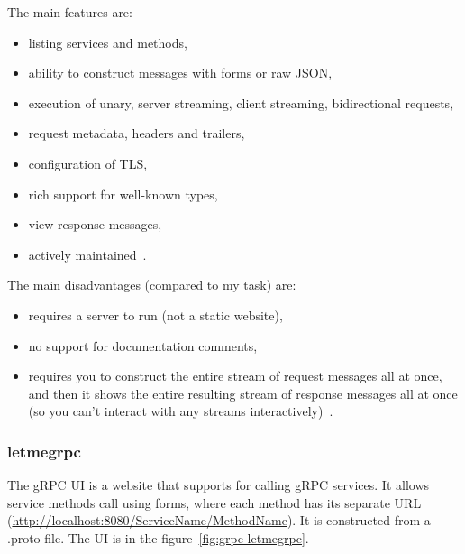 The main features are:
\begin{itemize}
    \item listing services and methods,
    \item ability to construct messages with forms or raw JSON,
    \item execution of unary, server streaming, client streaming, bidirectional requests,
    \item request metadata, headers and trailers,
    \item configuration of TLS,
    \item rich support for well-known types,
    \item view response messages,
    \item actively maintained~\cite{grpc-grpcui}.
\end{itemize}

The main disadvantages (compared to my task) are:
\begin{itemize}
    \item requires a server to run (not a static website),
    \item no support for documentation comments,
    \item requires you to construct the entire stream of request messages all at once, and then it shows the entire resulting stream of response messages all at once (so you can't interact with any streams interactively)~\cite{grpc-grpcui}.
\end{itemize}

\subsubsection{letmegrpc}
The gRPC UI is a website that supports for calling gRPC services.
It allows service methods call using forms, where each method has its separate URL (\url{http://localhost:8080/ServiceName/MethodName}).
It is constructed from a .proto file.
The UI is in the figure~\ref{fig:grpc-letmegrpc}.
\cite{grpc-letmegrpc}

